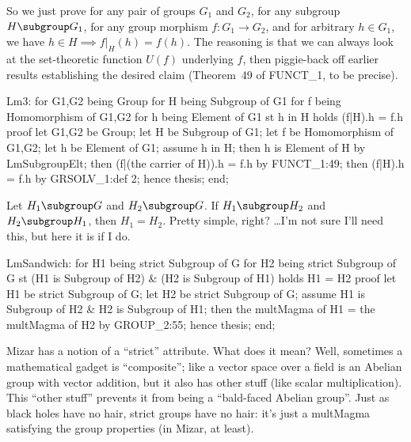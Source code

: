 So we just prove for any pair of groups $G_{1}$ and $G_{2}$,
for any subgroup $H\subgroup G_{1}$,
for any group morphism $f\colon G_{1}\to G_{2}$, and for arbitrary $h\in G_{1}$,
we have $h\in H\implies f|_{H}(h) = f(h)$. The reasoning is that we can
always look at the set-theoretic function $U(f)$ underlying $f$, then
piggie-back off earlier results establishing the desired claim
(Theorem~49 of {\Tt{}FUNCT{\_}1\nwendquote}, to be precise).

\nwenddocs{}\plusendmoddef\nwstartdeflinemarkup{}\nwenddeflinemarkup
Lm3: for G1,G2 being Group
for H being Subgroup of G1
for f being Homomorphism of G1,G2
for h being Element of G1
st h in H
holds (f|H).h = f.h
proof
  let G1,G2 be Group;
  let H be Subgroup of G1;
  let f be Homomorphism of G1,G2;
  let h be Element of G1;
  assume h in H;
  then h is Element of H by LmSubgroupElt;
  then (f|(the carrier of H)).h = f.h by FUNCT_1:49;
  then (f|H).h = f.h by GRSOLV_1:def 2;
  hence thesis;
end;

\nwendcode{}\nwdocspar

\M
Let $H_{1}\subgroup G$ and $H_{2}\subgroup G$.
If $H_{1}\subgroup H_{2}$ and $H_{2}\subgroup H_{1}$, then
$H_{1}=H_{2}$. Pretty simple, right? \dots I'm not sure I'll need this,
but here it is if I do.

\nwenddocs{}\endmoddef\nwstartdeflinemarkup\nwenddeflinemarkup
LmSandwich: for H1 being strict Subgroup of G
for H2 being strict Subgroup of G
st (H1 is Subgroup of H2) & (H2 is Subgroup of H1)
holds H1 = H2
proof
  let H1 be strict Subgroup of G;
  let H2 be strict Subgroup of G;
  assume H1 is Subgroup of H2 & H2 is Subgroup of H1;
  then the multMagma of H1 = the multMagma of H2 by GROUP_2:55;
  hence thesis;
end;

\nwendcode{}\nwdocspar

\begin{remark}
Mizar has a notion of a ``{\Tt{}strict\nwendquote}'' attribute. What does it mean?
Well, sometimes a mathematical gadget is ``composite''; like a vector
space over a field is an Abelian group with vector addition, but it also
has other stuff (like scalar multiplication). This ``other stuff''
prevents it from being a ``bald-faced Abelian group''. Just as black
holes have no hair, strict groups have no hair: it's just a
{\Tt{}multMagma\nwendquote} satisfying the group properties (in Mizar, at least).
\end{remark}

